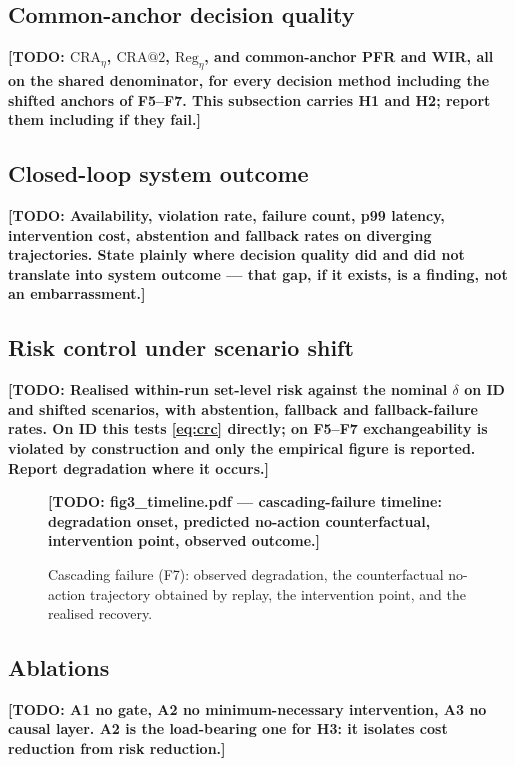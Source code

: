 \documentclass[journal]{IEEEtran}
\newcommand{\TODO}[1]{\textbf{[TODO: #1]}}
\begin{document}
\subsection{Common-anchor decision quality}
\TODO{$\mathrm{CRA}_\eta$, $\mathrm{CRA@2}$, $\mathrm{Reg}_\eta$, and
common-anchor PFR and WIR, all on the shared denominator, for every decision
method including the shifted anchors of F5--F7. This subsection carries H1 and
H2; report them including if they fail.}

\subsection{Closed-loop system outcome}
\TODO{Availability, violation rate, failure count, p99 latency, intervention
cost, abstention and fallback rates on diverging trajectories. State plainly
where decision quality did and did not translate into system outcome --- that
gap, if it exists, is a finding, not an embarrassment.}



\subsection{Risk control under scenario shift}
\TODO{Realised within-run set-level risk against the nominal $\delta$ on ID and
shifted scenarios, with abstention, fallback and fallback-failure rates. On ID
this tests \eqref{eq:crc} directly; on F5--F7 exchangeability is violated by
construction and only the empirical figure is reported. Report degradation where
it occurs.}

\begin{figure}[!t]
\centering
\TODO{fig3\_timeline.pdf --- cascading-failure timeline: degradation onset,
predicted no-action counterfactual, intervention point, observed outcome.}
\caption{Cascading failure (F7): observed degradation, the counterfactual
no-action trajectory obtained by replay, the intervention point, and the
realised recovery.}
\label{fig:timeline}
\end{figure}

\subsection{Ablations}
\TODO{A1 no gate, A2 no minimum-necessary intervention, A3 no causal layer.
A2 is the load-bearing one for H3: it isolates cost reduction from risk
reduction.}


\end{document}

